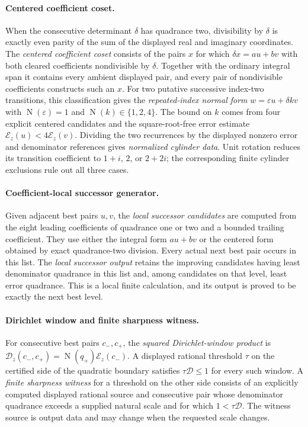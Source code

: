 \documentclass[11pt]{article}
\newcommand{\Norm}[1]{\operatorname{N}\!\left(#1\right)}
\begin{document}
\paragraph{Centered coefficient coset.}
When the consecutive determinant $\delta$ has quadrance two, divisibility by
$\delta$ is exactly even parity of the sum of the displayed real and
imaginary coordinates.  The \emph{centered coefficient coset} consists of
the pairs $x$ for which
$\delta x=a u+bv$ with both cleared coefficients nondivisible by $\delta$.
Together with the ordinary integral span it contains every ambient displayed
pair, and every pair of nondivisible coefficients constructs such an $x$.
For two putative successive index-two transitions, this classification gives
the \emph{repeated-index normal form}
$w=\varepsilon u+\delta k v$ with $\Norm\varepsilon=1$ and
$\Norm k\in\{1,2,4\}$.  The bound on $k$ comes from four explicit centered
candidates and the square-root-free error estimate
$\mathcal E_z(u)<4\mathcal E_z(v)$.  Dividing the two recurrences by the
displayed nonzero error and denominator references gives \emph{normalized
cylinder data}.  Unit rotation reduces its transition coefficient to
$1+i$, $2$, or $2+2i$; the corresponding finite cylinder exclusions rule
out all three cases.

\paragraph{Coefficient-local successor generator.}
Given adjacent best pairs $u,v$, the \emph{local successor candidates} are
computed from the eight leading coefficients of quadrance one or two and a
bounded trailing coefficient.  They use either the integral form $au+bv$ or
the centered form obtained by exact quadrance-two division.  Every actual
next best pair occurs in this list.  The \emph{local successor output} retains
the improving candidates having least denominator quadrance in this list and,
among candidates on that level, least error quadrance.  This is a local finite
calculation, and its output is proved to be exactly the next best level.

\paragraph{Dirichlet window and finite sharpness witness.}
For consecutive best pairs $c_-,c_+$, the \emph{squared Dirichlet-window
product} is
$\mathcal D_z(c_-,c_+)=\Norm{q_+}\mathcal E_z(c_-)$.  A displayed rational
threshold $\tau$ on the certified side of the quadratic boundary satisfies
$\tau\mathcal D\le1$ for every such window.  A \emph{finite sharpness
witness} for a threshold on the other side consists of an explicitly
computed displayed rational source and consecutive pair whose denominator
quadrance exceeds a supplied natural scale and for which
$1<\tau\mathcal D$.  The witness source is output data and may change when
the requested scale changes.
\end{document}
